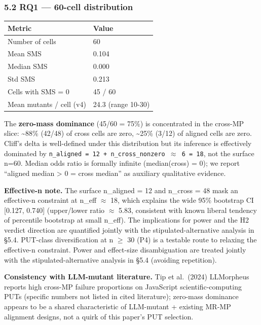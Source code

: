 \documentclass[review,12pt,authoryear]{elsarticle}
\newcounter{none}                   %
\begin{document}
\subsubsection{5.2 RQ1 --- 60-cell
distribution}\label{rq1-60-cell-distribution}

{\def\LTcaptype{none} %
\begin{longtable}[]{@{}ll@{}}
\toprule\noalign{}
Metric & Value \\
\midrule\noalign{}
\endhead
\bottomrule\noalign{}
\endlastfoot
Number of cells & 60 \\
Mean SMS & 0.104 \\
Median SMS & 0.000 \\
Std SMS & 0.213 \\
Cells with SMS = 0 & 45 / 60 \\
Mean mutants / cell (v4) & 24.3 (range 10-30) \\
\end{longtable}
}

The \textbf{zero-mass dominance} (45/60 = 75\%) is concentrated in the
cross-MP slice: \textasciitilde88\% (42/48) of cross cells are zero,
\textasciitilde25\% (3/12) of aligned cells are zero. Cliff's delta is
well-defined under this distribution but its inference is effectively
dominated by
\texttt{n\_aligned\ =\ 12\ +\ n\_cross\_nonzero\ $\approx$\ 6\ =\ 18}, not the
surface n=60. Median odds ratio is formally infinite (median(cross) =
0); we report ``aligned median \textgreater{} 0 = cross median'' as
auxiliary qualitative evidence.

\textbf{Effective-n note.} The surface n\_aligned = 12 and n\_cross = 48
mask an effective-n constraint at n\_eff $\approx$ 18, which explains the wide
95\% bootstrap CI {[}0.127, 0.740{]} (upper/lower ratio $\approx$ 5.83,
consistent with known liberal tendency of percentile bootstrap at small
n\_eff). The implications for power and the H2 verdict direction are
quantified jointly with the stipulated-alternative analysis in §5.4.
PUT-class diversification at n $\geq$ 30 (P4) is a testable route to relaxing
the effective-n constraint. Power and effect-size disambiguation are
treated jointly with the stipulated-alternative analysis in §5.4
(avoiding repetition).

\textbf{Consistency with LLM-mutant literature.} Tip et al.~(2024)
LLMorpheus reports high cross-MP failure proportions on JavaScript
scientific-computing PUTs (specific numbers not listed in cited
literature); zero-mass dominance appears to be a shared characteristic
of LLM-mutant + existing MR-MP alignment designs, not a quirk of this
paper's PUT selection.
\end{document}
